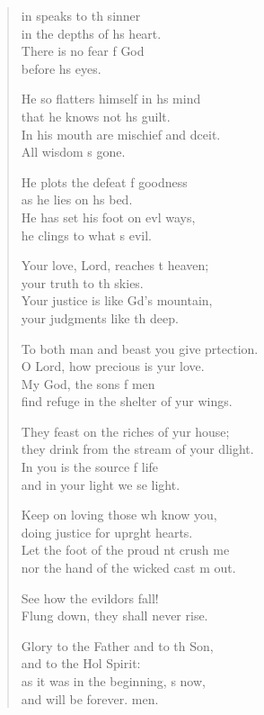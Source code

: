 \settowidth{\versewidth}{To both man and beast you give protection. *}
\begin{verse}%
  \begin{patverse}
    in speaks to th sinner\Med\\
in the depths of h\pointup{\i}s heart.\\
There is no fear f God\Med\\
before h\pointup{\i}s eyes.

He so flatters himself in h\pointup{\i}s mind\Med\\
that he knows not h\pointup{\i}s guilt.\\
In his mouth are mischief and dceit.\Med\\
All wisdom \pointup{\i}s gone.

He plots the defeat f goodness\Med\\
as he lies on h\pointup{\i}s bed.\\
He has set his foot on ev\pointup{\i}l ways,\Med\\
he clings to what \pointup{\i}s evil.

Your love, Lord, reaches t heaven;\Med\\
your truth to th skies.\\
Your justice is like Gd’s mountain,\Med\\
your judgments like th deep.

To both man and beast you give prtection.\Med\\
O Lord, how precious is yur love.\\
My God, the sons f men\Med\\
find refuge in the shelter of yur wings.

They feast on the riches of yur house;\Med\\
they drink from the stream of your dlight.\\
In you is the source f life\Med\\
and in your light we se light.

Keep on loving those wh know you,\Med\\
doing justice for upr\pointup{\i}ght hearts.\\
Let the foot of the proud nt crush me\Med\\
nor the hand of the wicked cast m out.

See how the evildors fall!\Med\\
Flung down, they shall never rise.

Glory to the Father and to th Son,\Med\\
and to the Hol Spirit:\\
as it was in the beginning, \pointup{\i}s now,\Med\\
and will be forever. men. 
  \end{patverse}
\end{verse}
